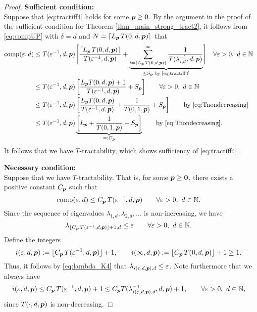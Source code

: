 \documentclass[sort&compress]{elsarticle}
\newcommand{\thed}{\delta}
\begin{document}
\begin{proof}
    \textbf{Sufficient condition:}\\
Suppose that \eqref{eq:tractiff4} holds for some $\boldsymbol{p} \ge 0$. 
By the argument in the proof of the sufficient condition for Theorem \ref{thm_main_strong_tract2}, it follows from \eqref{eq:compUP} with $\thed=d$ and $N = \lceil L_{\boldsymbol{p}}\, T(0,d,\boldsymbol{p})\rceil$ that 
\begin{align*}
       \operatorname{comp}(\varepsilon,d)
       & \le T(\varepsilon^{-1},d,\boldsymbol{p}) \Biggl [ 
       \frac{\lceil L_{\boldsymbol{p}}\, T(0,d,\boldsymbol{p})\rceil}{T(\varepsilon^{-1},d,\boldsymbol{p})}  + 
       \underbrace{\sum_{i=\lceil L_{\boldsymbol{p}}\, T(0,d,\boldsymbol{p})\rceil}^\infty \frac{1}{T(\lambda_{i, d}^{-1},d,\boldsymbol{p})}}_{\le S_{\boldsymbol{p}} \text{ by \eqref{eq:tractiff4}}}
       \Biggr ] 
        \quad \forall \varepsilon > 0, \ d  \in \mathbb{N}\\
       & \le T(\varepsilon^{-1},d,\boldsymbol{p})\left[\frac{L_{\boldsymbol{p}} T(0,d,\boldsymbol{p})+1}{T(\varepsilon^{-1},d, \boldsymbol{p})} +  S_{\boldsymbol{p}} \right]
        \qquad \forall \varepsilon > 0, \ d  \in \mathbb{N}\\
       & \le T(\varepsilon^{-1},d,\boldsymbol{p})\left[\frac{L_{\boldsymbol{p}} T(0,d,\boldsymbol{p})}{T(\varepsilon^{-1},d, \boldsymbol{p})}
       + \frac{1}{T(0,1, \boldsymbol{p})} + S_{\boldsymbol{p}}\right]
       \qquad \text{by \eqref{eq:Tnondecreasing}}   \\
       & \le T(\varepsilon^{-1},d,\boldsymbol{p}) 
       \underbrace{\left [  L_{\boldsymbol{p}} + \frac{1}{T(0,1, \boldsymbol{p})} + S_{\boldsymbol{p}} \right]}_{=:C_{\boldsymbol{p}}}
       \qquad \text{by \eqref{eq:Tnondecreasing}} .
\end{align*}
It follows that we have $T$-tractability, which shows sufficiency of \eqref{eq:tractiff4}.

\bigskip

\noindent \textbf{Necessary condition:}\\
Suppose that we have
$T$-tractability. That is, for some $\boldsymbol{p} \ge \boldsymbol{0}$, there exists a positive constant $C_{\boldsymbol{p}}$ such that
\[
\operatorname{comp}(\varepsilon,d)\le C_{\boldsymbol{p}}\, T(\varepsilon^{-1},d,\boldsymbol{p}) \qquad \forall \varepsilon > 0,  \ d \in \mathbb{N}.
\]
Since the sequence of eigenvalues $\lambda_{1,d}, \lambda_{2,d}, \ldots $ is non-increasing, we have
\begin{equation}\label{eq:lambda_K4}
	\lambda_{\lfloor C_{\boldsymbol{p}}\, T(\varepsilon^{-1},d,\boldsymbol{p})\rfloor +1,d}\le \varepsilon \qquad \forall \varepsilon > 0,  \ d \in \mathbb{N}.
\end{equation}
Define the integers
\[
i (\varepsilon,d,\boldsymbol{p}):= \lfloor C_{\boldsymbol{p}}\, T(\varepsilon^{-1},d,\boldsymbol{p})\rfloor +1, \qquad
i (\infty,d,\boldsymbol{p}) := \lfloor C_{\boldsymbol{p}}\, T(0,d,\boldsymbol{p})\rfloor +1 \ge 1.
\]
Thus, it follows by \eqref{eq:lambda_K4} that $\lambda_{i(\varepsilon,d,\boldsymbol{p}),d} \le \varepsilon$.
Note furthermore that we always have
\[
i(\varepsilon,d,\boldsymbol{p})\le C_{\boldsymbol{p}}\, T(\varepsilon^{-1},d,\boldsymbol{p})+1 \le C_{\boldsymbol{p}} T(\lambda_{i(\varepsilon,d,\boldsymbol{p}),d}^{-1},d,\boldsymbol{p})+1, \qquad \forall \varepsilon > 0, \ d \in \mathbb{N},
\]
since
$T(\cdot,d,\boldsymbol{p})$ is non-decreasing.


\end{proof}
\end{document}
